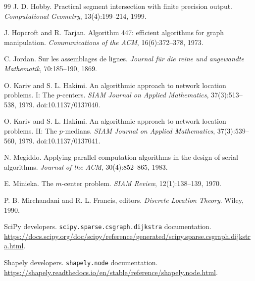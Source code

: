 \documentclass[11pt]{article}
\begin{document}
\begin{thebibliography}{99}
J. D. Hobby.
\newblock Practical segment intersection with finite precision output.
\newblock \emph{Computational Geometry}, 13(4):199--214, 1999.

J. Hopcroft and R. Tarjan.
\newblock Algorithm 447: efficient algorithms for graph manipulation.
\newblock \emph{Communications of the ACM}, 16(6):372--378, 1973.

C. Jordan.
\newblock Sur les assemblages de lignes.
\newblock \emph{Journal f\"ur die reine und angewandte Mathematik},
70:185--190, 1869.

O. Kariv and S. L. Hakimi.
\newblock An algorithmic approach to network location problems.
I: The \(p\)-centers.
\newblock \emph{SIAM Journal on Applied Mathematics},
37(3):513--538, 1979.
\newblock doi:10.1137/0137040.

O. Kariv and S. L. Hakimi.
\newblock An algorithmic approach to network location problems.
II: The \(p\)-medians.
\newblock \emph{SIAM Journal on Applied Mathematics},
37(3):539--560, 1979.
\newblock doi:10.1137/0137041.

N. Megiddo.
\newblock Applying parallel computation algorithms in the design of serial
algorithms.
\newblock \emph{Journal of the ACM}, 30(4):852--865, 1983.

E. Minieka.
\newblock The \(m\)-center problem.
\newblock \emph{SIAM Review}, 12(1):138--139, 1970.

P. B. Mirchandani and R. L. Francis, editors.
\newblock \emph{Discrete Location Theory}.
\newblock Wiley, 1990.

SciPy developers.
\newblock \texttt{scipy.sparse.csgraph.dijkstra} documentation.
\newblock \url{https://docs.scipy.org/doc/scipy/reference/generated/scipy.sparse.csgraph.dijkstra.html}.

Shapely developers.
\newblock \texttt{shapely.node} documentation.
\newblock \url{https://shapely.readthedocs.io/en/stable/reference/shapely.node.html}.

\end{thebibliography}
\end{document}
